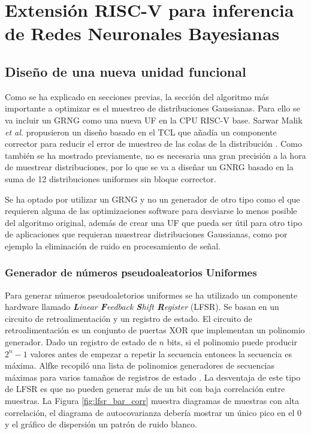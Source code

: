 \chapter{Extensión RISC-V para inferencia de Redes Neuronales Bayesianas} \label{ch:extension}

\section{Diseño de una nueva unidad funcional}

Como se ha explicado en secciones previas, la sección del algoritmo más importante a optimizar es el muestreo de distribuciones Gaussianas. Para ello se va incluir un GRNG como una nueva UF en la CPU RISC-V base. Sarwar Malik \emph{et al.} propusieron un diseño basado en el TCL que añadía un componente corrector para reducir el error de muestreo de las colas de la distribución \cite{clt_grng}. Como también se ha mostrado previamente, no es necesaria una gran precisión a la hora de muestrear distribuciones, por lo que se va a diseñar un GNRG basado en la suma de 12 distribuciones uniformes sin bloque corrector. 

Se ha optado por utilizar un GRNG y no un generador de otro tipo como el que requieren alguna de las optimizaciones software para desviarse lo menos posible del algoritmo original, además de crear una UF que pueda ser útil para otro tipo de aplicaciones que requieran muestrear distribuciones Gaussianas, como por ejemplo la eliminación de ruido en procesamiento de señal.

\subsection{Generador de números pseudoaleatorios Uniformes}

Para generar números pseudoaletorios uniformes se ha utilizado un componente hardware llamado \textit{\textbf{L}inear \textbf{F}eedback \textbf{S}hift \textbf{R}egister} (LFSR). Se basan en un circuito de retroalimentación y un registro de estado. El circuito de retroalimentación es un conjunto de puertas XOR que implementan un polinomio generador. Dado un registro de estado de $n$ bits, si el polinomio puede producir $2^n-1$ valores antes de empezar a repetir la secuencia entonces la secuencia es máxima. Alfke recopiló una lista de polinomios generadores de secuencias máximas para varios tamaños de registros de estado \cite{lfsr_poly}. La desventaja de este tipo de LFSR es que no pueden generar más de un bit con baja correlación entre muestras. La Figura \ref{fig:lfsr_bar_corr} muestra diagramas de muestras con alta correlación, el diagrama de autocovarianza debería mostrar un único pico en el 0 y el gráfico de dispersión un patrón de ruido blanco.

